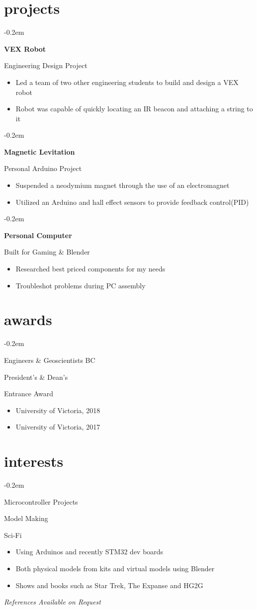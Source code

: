 \documentclass{article}
\newcommand{\ritem}[1]{
\item\hfill {#1}
}
\newcommand{\fancybullet}[2]{
{ {


\parbox[t]{5.5cm}{
\begin{minipage}[t]{5.5cm}
   \begin{list}{\quad}{}
   \itemsep-0.2em
     #1
   \end{list}
\end{minipage}
}
\parbox[t]{13cm}{
\begin{minipage}[t]{13cm}
   \begin{itemize}
   \itemsep-0.2em
     #2
   \end{itemize}
\end{minipage}
}}\newline}
}
\begin{document}
\section{projects}
\fancybullet{
\ritem{\bfseries{VEX Robot}}
\ritem{Engineering Design Project}
}
{
\item Led a team of two other engineering students to build and design a VEX robot
\item Robot was capable of quickly locating an IR beacon and attaching a string to it
}
\vspace{0.3em}
\fancybullet{
\ritem{\bfseries{Magnetic Levitation}}
\ritem{Personal Arduino Project}
}
{
\item Suspended a neodymium magnet through the use of an electromagnet
\item Utilized an Arduino and hall effect sensors to provide feedback control(PID)
}
\vspace{0.3em}

\vspace{0.3em}
\fancybullet{
\ritem{\bfseries{Personal Computer}}
\ritem{Built for Gaming \& Blender}
}
{
\item Researched best priced components for my needs
\item Troubleshot problems during PC assembly
}


\section{awards}

\fancybullet{
\ritem{Engineers \& Geoscientists BC}
\ritem{President's \& Dean's}
\ritem{Entrance Award}
}
{
\item University of Victoria, 2018
\item University of Victoria, 2017
}


\section{interests}

\fancybullet{
\ritem{Microcontroller Projects}
\ritem{Model Making}
\ritem{Sci-Fi}
}
{
\item Using Arduinos and recently STM32 dev boards
\item Both physical models from kits and virtual models using Blender
\item Shows and books such as Star Trek, The Expanse and HG2G
}
\vfill
\textit{References Available on Request}
\end{document}
